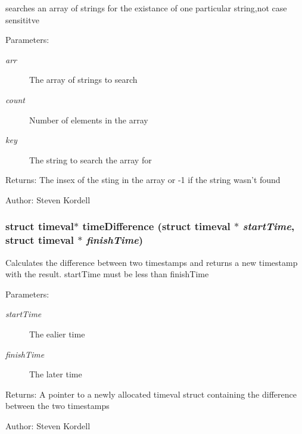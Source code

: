 searches an array of strings for the existance of one particular string,not case sensititve \begin{Desc}
\item[Parameters:]
\begin{description}
\item[{\em arr}]The array of strings to search \item[{\em count}]Number of elements in the array \item[{\em key}]The string to search the array for \end{description}
\end{Desc}
\begin{Desc}
\item[Returns:]The insex of the sting in the array or -1 if the string wasn't found \end{Desc}
\begin{Desc}
\item[Author:]Steven Kordell \end{Desc}
\subsubsection{\setlength{\rightskip}{0pt plus 5cm}struct timeval$\ast$ time\-Difference (struct timeval $\ast$ {\em start\-Time}, struct timeval $\ast$ {\em finish\-Time})}\label{cptest2_8c_f0ca43a71ab2d1afdf162ce6e783eebd}


Calculates the difference between two timestamps and returns a new timestamp with the result. start\-Time must be less than finish\-Time \begin{Desc}
\item[Parameters:]
\begin{description}
\item[{\em start\-Time}]The ealier time \item[{\em finish\-Time}]The later time \end{description}
\end{Desc}
\begin{Desc}
\item[Returns:]A pointer to a newly allocated timeval struct containing the difference between the two timestamps \end{Desc}
\begin{Desc}
\item[Author:]Steven Kordell \end{Desc}
